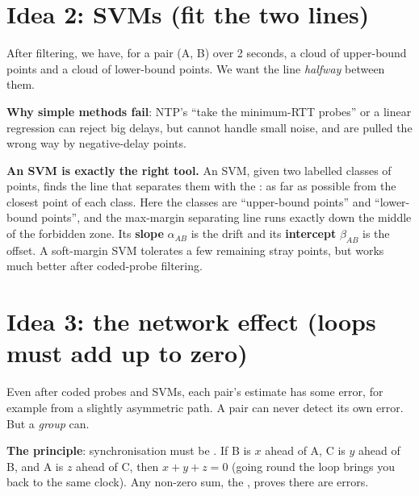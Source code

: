 \section{Idea 2: SVMs (fit the two lines)}

After filtering, we have, for a pair (A, B) over 2 seconds, a cloud of upper-bound points and a cloud of lower-bound points. We want the line
\emph{halfway} between them.

\textbf{Why simple methods fail}: NTP's ``take the minimum-RTT probes'' or a linear regression can reject big delays, but cannot handle small noise,
and are pulled the wrong way by negative-delay points.

\textbf{An SVM is exactly the right tool.} An SVM, given two labelled classes of points, finds the line that separates them with the : as far as possible from the closest point of each class. Here the classes are ``upper-bound points'' and ``lower-bound points'', and the
max-margin separating line runs exactly down the middle of the forbidden zone. Its \textbf{slope} $\alpha_{AB}$ is the drift and its
\textbf{intercept} $\beta_{AB}$ is the offset. A soft-margin SVM tolerates a few remaining stray points, but works much better after coded-probe
filtering.

\section{Idea 3: the network effect (loops must add up to zero)}

Even after coded probes and SVMs, each pair's estimate has some error, for example from a slightly asymmetric path. A pair can never detect its own error.
But a \emph{group} can.


\textbf{The principle}: synchronisation must be . If B is $x$ ahead of A, C is $y$ ahead of B, and A is $z$ ahead of C, then $x + y + z = 0$
(going round the loop brings you back to the same clock). Any non-zero sum, the , proves there are errors.


